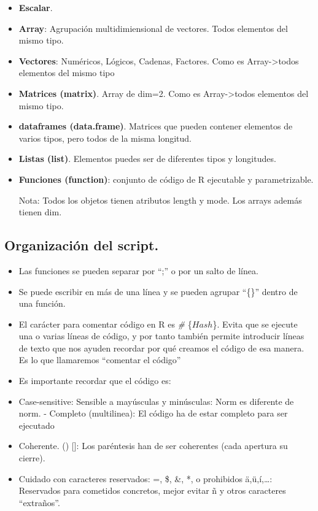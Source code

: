 \documentclass[
  letterpaper,
  DIV=11,
  numbers=noendperiod]{scrreprt}
\begin{document}
\begin{itemize}
\item
  \textbf{Escalar}.
\item
  \textbf{Array}: Agrupación multidimiensional de vectores. Todos
  elementos del mismo tipo.
\item
  \textbf{Vectores}: Numéricos, Lógicos, Cadenas, Factores. Como es
  Array-\textgreater todos elementos del mismo tipo
\item
  \textbf{Matrices (matrix)}. Array de dim=2. Como es
  Array-\textgreater todos elementos del mismo tipo.
\item
  \textbf{dataframes (data.frame)}. Matrices que pueden contener
  elementos de varios tipos, pero todos de la misma longitud.
\item
  \textbf{Listas (list)}. Elementos puedes ser de diferentes tipos y
  longitudes.
\item
  \textbf{Funciones (function)}: conjunto de código de R ejecutable y
  parametrizable.

  Nota: Todos los objetos tienen atributos length y mode. Los arrays
  además tienen dim.
\end{itemize}

\hypertarget{organizaciuxf3n-del-script.}{%
\subsection{Organización del
script.}\label{organizaciuxf3n-del-script.}}

\begin{itemize}
\item
  Las funciones se pueden separar por ``;'' o por un salto de línea.
\item
  Se puede escribir en más de una línea y se pueden agrupar ``\{\}''
  dentro de una función.
\item
  El carácter para comentar código en R es \emph{\#} \{\(Hash\)\}. Evita
  que se ejecute una o varias líneas de código, y por tanto también
  permite introducir líneas de texto que nos ayuden recordar por qué
  creamos el código de esa manera. Es lo que llamaremos ``comentar el
  código''
\item
  Es importante recordar que el código es:
\item
  Case-sensitive: Sensible a mayúsculas y minúsculas: Norm es diferente
  de norm. - Completo (multilinea): El código ha de estar completo para
  ser ejecutado
\item
  Coherente. () {[}{]}: Los paréntesis han de ser coherentes (cada
  apertura su cierre).
\item
  Cuidado con caracteres reservados: =, \$, \&, *, o prohibidos
  ä,ü,í,\ldots: Reservados para cometidos concretos, mejor evitar ñ y
  otros caracteres ``extraños''.
\end{itemize}
\end{document}
